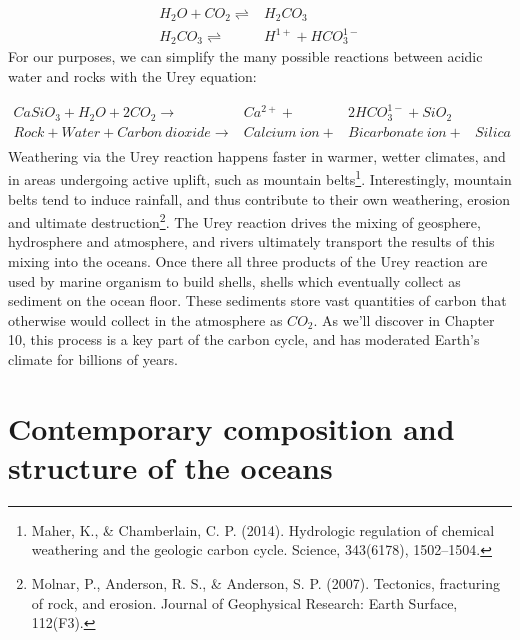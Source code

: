 \documentclass[amstex,12pt]{book}
\begin{document}
\begin{align} \label{eq:carbonic}
	H_2O+CO_2 \rightleftharpoons & H_2CO_3\\
	H_2CO_3  \rightleftharpoons & H^{1+} + HCO_3^{1-}
\end{align}
For our purposes, we can simplify the many possible reactions between acidic water and rocks with the Urey equation:

\begin{align} \label{eq:urey}
	CaSiO_3 + H_2O + 2CO_2  \rightarrow & Ca^{2+} + & 2HCO_3^{1-} + SiO_2\\
	Rock + Water + Carbon\ dioxide \rightarrow & Calcium\ ion + &  Bicarbonate\ ion  + & Silica \\
\end{align}
Weathering via the Urey reaction happens faster in warmer, wetter climates, and in areas undergoing active uplift, such as mountain belts\footnote{Maher, K., \& Chamberlain, C. P. (2014). Hydrologic regulation of chemical weathering and the geologic carbon cycle. Science, 343(6178), 1502–1504.}. Interestingly, mountain belts tend to induce rainfall, and thus contribute to their own weathering, erosion and ultimate destruction\footnote{Molnar, P., Anderson, R. S., \& Anderson, S. P. (2007). Tectonics, fracturing of rock, and erosion. Journal of Geophysical Research: Earth Surface, 112(F3).}.  The Urey reaction drives the mixing of geosphere, hydrosphere and atmosphere, and rivers ultimately transport the results of this mixing into the oceans. Once there all three products of the Urey reaction are used by marine organism to build shells, shells which eventually collect as sediment on the ocean floor. These sediments store vast quantities of carbon that otherwise would collect in the atmosphere as $CO_2$. As we'll discover in Chapter 10, this process is a key part of the carbon cycle, and has moderated Earth's climate for billions of years.

\section{Contemporary composition and structure of the oceans}
\end{document}
